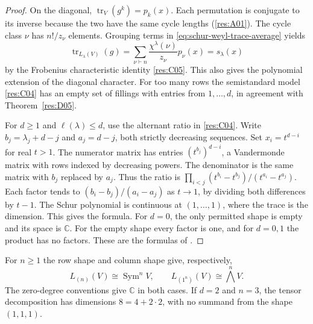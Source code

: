 \begin{proof}
On the diagonal, \(\operatorname{tr}_V(g^k)=p_k(x)\).
Each permutation is conjugate to its inverse because the two
have the same cycle lengths (\ref{res:A01}). The cycle
class \(\nu\) has \(n!/z_\nu\) elements. Grouping terms in
\eqref{eq:schur-weyl-trace-average} yields
\[
 \operatorname{tr}_{L_\lambda(V)}(g)
    =\sum_{\nu\vdash n}\frac{\chi^\lambda(\nu)}{z_\nu}p_\nu(x)
    =s_\lambda(x)
\]
by the Frobenius characteristic identity \ref{res:C05}. This
also gives the polynomial extension of the diagonal character.
For too many rows the semistandard model \ref{res:C04}
has an empty set of fillings with entries from \(1,\ldots,d\),
in agreement with Theorem~\ref{res:D05}.

For \(d\geq1\) and \(\ell(\lambda)\leq d\), use the
alternant ratio in \ref{res:C04}. Write \(b_j=\lambda_j+d-j\)
and \(a_j=d-j\), both strictly decreasing sequences.
Set \(x_i=t^{d-i}\) for real \(t>1\). The numerator matrix
has entries \((t^{b_j})^{d-i}\), a Vandermonde matrix with rows
indexed by decreasing powers. The denominator is the same
matrix with \(b_j\) replaced by \(a_j\). Thus the ratio is
\(\prod_{i<j}(t^{b_i}-t^{b_j})/(t^{a_i}-t^{a_j})\).
Each factor tends to \((b_i-b_j)/(a_i-a_j)\) as \(t\to1\),
by dividing both differences by \(t-1\). The Schur polynomial
is continuous at \((1,\ldots,1)\), where the trace is the
dimension. This gives the formula. For \(d=0\), the only
permitted shape is empty and its space is \(\mathbb C\).
For the empty shape every factor is one, and for \(d=0,1\)
the product has no factors. These are the formulas of
\cite[Theorem 4.63]{etingof}.
\end{proof}

\begin{example}
\label{res:D09}
For \(n\geq1\) the row shape and column shape give, respectively,
\[
 L_{(n)}(V)\cong\operatorname{Sym}^n V,\qquad
 L_{(1^n)}(V)\cong\bigwedge^n V.
\]
The zero-degree conventions give \(\mathbb C\) in both cases.
If \(d=2\) and \(n=3\), the tensor decomposition has dimensions
\(8=4+2\cdot2\), with no summand from the shape \((1,1,1)\).
\end{example}

